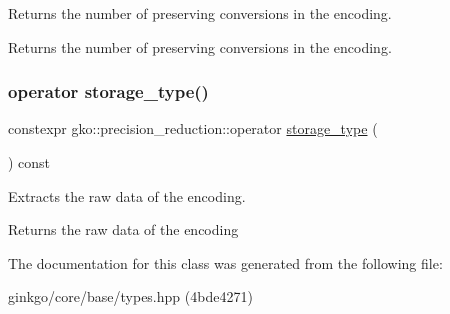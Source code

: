 Returns the number of preserving conversions in the encoding. 

\begin{DoxyReturn}{Returns}
the number of preserving conversions in the encoding. 
\end{DoxyReturn}
\mbox{\label{classgko_1_1precision__reduction_a3ee4da03be089565f7ab91b553d7738f}} 
\subsubsection{\texorpdfstring{operator storage\+\_\+type()}{operator storage\_type()}}
{\footnotesize\ttfamily constexpr gko\+::precision\+\_\+reduction\+::operator \hyperlink{classgko_1_1precision__reduction_a2a1a94a27fa69b4cc321136b56e7b7d9}{storage\+\_\+type} (\begin{DoxyParamCaption}{ }\end{DoxyParamCaption}) const\hspace{0.3cm}{\ttfamily [noexcept]}}



Extracts the raw data of the encoding. 

\begin{DoxyReturn}{Returns}
the raw data of the encoding 
\end{DoxyReturn}


The documentation for this class was generated from the following file\+:\begin{DoxyCompactItemize}
\item 
ginkgo/core/base/types.\+hpp (4bde4271)\end{DoxyCompactItemize}
